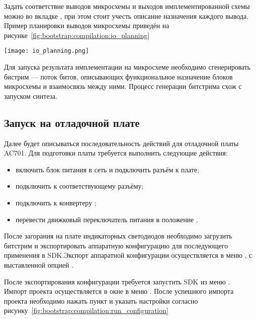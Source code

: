 Задать соответствие выводов микросхемы и выходов имплементированной схемы можно во вкладке ,
при этом стоит учесть описание назначения каждого вывода. Пример планировки выводов микросхемы
приведён на рисунке~\ref{fig:bootstrap:compilation:io_planning}

\begin{center}
  \centering
  \texttt{[image: io\_planning.png]}
  \label{fig:bootstrap:compilation:io_planning}
\end{center}

Для запуска результата имплементации на микросхеме необходимо сгенерировать бистрим ---
поток битов, описывающих функциональное назначение блоков микросхемы и взаимосвязь
между ними. Процесс генерации битстрима схож с запуском синтеза.

\subsection{Запуск на отладочной плате}
\label{sec:bootstrap:board}

Далее будет описываться последовательность действий для отладочной платы
AC701. Для подготовки платы требуется выполнить следующие действия:
\begin{itemize}
  \item включить блок питания в сеть и подключить разъём к плате;
  \item подключить  к соответствующему разъёму;
  \item подключить  к конвертеру ;
  \item перевести движковый переключатель питания в положение .
\end{itemize}

После загорания на плате индикаторных светодиодов необходимо загрузить
битстрим и экспортировать аппаратную конфигурацию для последующего
применения в SDK.Экспорт аппаратной конфигурации осуществляется в
меню , с выставленной опцией .


После экспортирования конфигурации требуется запустить SDK из меню .
Импорт проекта осуществляется в окне  в меню .
После успешного импорта проекта необходимо нажать пункт  и
указать настройки согласно рисунку~\ref{fig:bootstrap:compilation:run_configuration}

